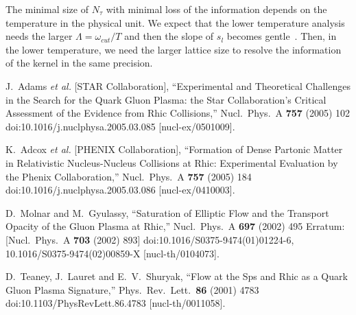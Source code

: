 \documentclass[a4paper,11pt]{article}
\begin{document}
The minimal size of $N_\tau$ with minimal loss of the information depends on the temperature in the physical unit.
We expect that the lower temperature analysis needs the larger $\Lambda= \omega_{cut}/T$ and then the slope of $s_l$ becomes gentle~\cite{Chikano2018a,Chikano2018b,Li2019}.
Then, in the lower temperature, we need the larger lattice size to resolve the information of the kernel in the same precision.



\begin{thebibliography}{99}


  J.~Adams {\it et al.} [STAR Collaboration],
  ``Experimental and Theoretical Challenges in the Search for the Quark Gluon Plasma: the Star Collaboration's Critical Assessment of the Evidence from Rhic Collisions,''
  Nucl.\ Phys.\ A {\bf 757} (2005) 102
  doi:10.1016/j.nuclphysa.2005.03.085
  [nucl-ex/0501009].


  K.~Adcox {\it et al.} [PHENIX Collaboration],
  ``Formation of Dense Partonic Matter in Relativistic Nucleus-Nucleus Collisions at Rhic: Experimental Evaluation by the Phenix Collaboration,''
  Nucl.\ Phys.\ A {\bf 757} (2005) 184
  doi:10.1016/j.nuclphysa.2005.03.086
  [nucl-ex/0410003].



  D.~Molnar and M.~Gyulassy,
  ``Saturation of Elliptic Flow and the Transport Opacity of the Gluon Plasma at Rhic,''
  Nucl.\ Phys.\ A {\bf 697} (2002) 495
   Erratum: [Nucl.\ Phys.\ A {\bf 703} (2002) 893]
  doi:10.1016/S0375-9474(01)01224-6, 10.1016/S0375-9474(02)00859-X
  [nucl-th/0104073].


  D.~Teaney, J.~Lauret and E.~V.~Shuryak,
  ``Flow at the Sps and Rhic as a Quark Gluon Plasma Signature,''
  Phys.\ Rev.\ Lett.\  {\bf 86} (2001) 4783
  doi:10.1103/PhysRevLett.86.4783
  [nucl-th/0011058].


\end{thebibliography}
\end{document}
